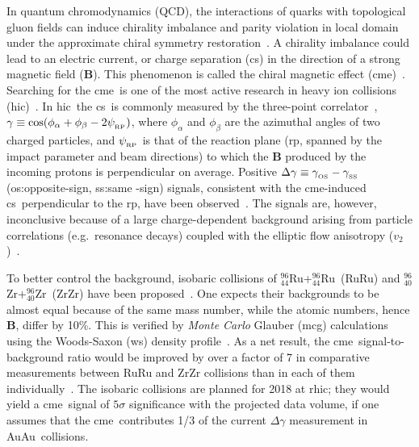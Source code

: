 \documentclass[3p,times,procedia]{elsarticle}
\newcommand {\hic}	{{\sc hic}}
\newcommand {\rhic}	{{\sc rhic}}
\newcommand {\mcg}	{{\sc mcg}}
\newcommand {\ws}	{{\sc ws}}
\newcommand {\cme}	{{\mbox{\sc cme}}}
\newcommand {\cs}	{{\sc cs}}
\newcommand {\RP}	{{\sc rp}}
\newcommand {\psiRP}	{\psi_{_{\rm RP}}}
\newcommand {\vv}	{v_2}
\newcommand {\Ru}	{$^{96}_{44}$Ru}
\newcommand {\Zr}	{$^{96}_{40}$Zr}
\newcommand {\RuRu}	{RuRu}
\newcommand {\ZrZr}	{ZrZr}
\newcommand {\AuAu}	{AuAu}
\newcommand {\Bbf}	{\mathbf{B}}
\newcommand {\gOS}	{\gamma_{_{\rm OS}}}
\newcommand {\gSS}	{\gamma_{_{\rm SS}}}
\newcommand {\dg}	{\Delta\gamma}
\newcommand {\mean}[1]	{\langle #1\rangle}
\begin{document}
In quantum chromodynamics (QCD), the interactions of quarks with topological gluon fields can induce chirality imbalance and parity violation in local domain under the approximate chiral symmetry restoration~\cite{Kharzeev:1998kz}. A chirality imbalance could lead to an electric current, or charge separation (\cs) %
in the direction of a strong magnetic field ($\Bbf$). %
This phenomenon is called the chiral magnetic effect (\cme)~\cite{Kharzeev:1998kz}. %
Searching for the \cme\ is one of the most active research in heavy ion collisions (\hic)~\cite{Kharzeev:2015znc,Zhao:2018ixy}. In \hic\ the \cs\ is commonly measured by the three-point correlator~\cite{Voloshin:2004vk}, $\gamma\equiv\cos(\phi_\alpha+\phi_\beta-2\psiRP)$, where $\phi_\alpha$ and $\phi_\beta$ are the azimuthal angles of two charged particles, and $\psiRP$ is that of the reaction plane (\RP, spanned by the impact parameter and beam directions) to which the $\Bbf$ produced by the incoming protons is perpendicular on average. %
Positive $\dg\equiv\gOS-\gSS$ ({\sc os}:opposite-sign, {\sc ss}:same -sign) signals, consistent with the \cme-induced \cs\ perpendicular to the \RP, have been observed~\cite{Adamczyk:2014mzf}. 
The signals are, however, inconclusive because of a large charge-dependent background arising from particle correlations (e.g.~resonance decays) coupled with the elliptic flow anisotropy ($\vv$)~\cite{Wang:2009kd}. 

To better control the background, isobaric collisions of \Ru+\Ru\ (\RuRu) and \Zr+\Zr\ (\ZrZr) have been proposed~\cite{Voloshin:2010ut}. One expects their backgrounds to be almost equal because of the same mass number, while the atomic numbers, hence $\Bbf$, differ by 10\%. 
This is verified by {\em Monte Carlo} Glauber (\mcg) calculations using the Woods-Saxon (\ws) density profile~\cite{Deng:2016knn}.
As a net result, the \cme\ signal-to-background ratio would be improved by over a factor of 7 in comparative measurements between RuRu and ZrZr collisions than in each of them individually~\cite{Deng:2016knn}.  
The isobaric collisions are planned for 2018 at \rhic; they would yield a \cme\ signal of $5\sigma$ significance with the projected data volume, %
if one assumes that the \cme\ contributes 1/3 of the current $\dg$ measurement in \AuAu\ collisions.
\end{document}
